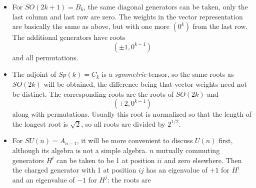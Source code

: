 \begin{itemize}
	The adjoint representation is an antisymmetric tensor, which is contained in the product of two vector representations. Weights are additive, so by adding any two different (due to antisymmetry) vector weights together, the root is obtained. This gives
	\begin{equation}
		(+1,+1,0^{k-2})\:,\quad (+1,-1,0^{k-2})\:,\quad (-1,-1,0^{k-2})\:, \label{11.4.16}
	\end{equation}
	and all their permutations. By adding any weight and its opposite weight together, we obtain $k$ zero roots, which are $H^{i}$.
	\begin{tcolorbox}[breakable]
		Examine the antisymmetric product $\lvert\lambda_{1}\rangle\wedge \lvert\lambda_{2}\rangle$ of 2 $2k$-vectors $\lvert \lambda_{1,2}\rangle$, and assume $\lvert\lambda_{1,2}\rangle$ only have eigenvalues $+1$ under $H^{1,2}$ respectively, then
		\begin{align*}
			&H^{1}\lvert \lambda_{1} \rangle \wedge \lvert \lambda_{2} \rangle = 1\\
			&H^{2} \lvert \lambda_{1} \rangle \wedge \lvert \lambda_{2} \rangle =1
		\end{align*}
		From this, (\ref{11.4.16}) is obtained
	\end{tcolorbox}
	In the spinor representation, weight $w^{i}$ is given by all $k$-vectors with all components being $\frac{1}{2}$, where $\mathbf{2^{k-1}}$ has an even number of $-\frac{1}{2}$, while $\mathbf{2^{k-1}}^{\prime}$ has an odd number.
	\item For $SO(2k+1)=B_{k}$, the same diagonal generators can be taken, only the last column and last row are zero. The weights in the vector representation are basically the same as above, but with one more $(0^{k})$ from the last row. The additional generators have roots
	\begin{equation}
		(\pm1,0^{k-1}) \label{11.4.17}
	\end{equation}
	and all permutations.
	\item The adjoint of $Sp(k)=C_{k}$ is a \emph{symmetric} tensor, so the same roots as $SO(2k)$ will be obtained, the difference being that vector weights need not be distinct. The corresponding roots are the roots of $SO(2k)$ and
	\begin{equation}
		(\pm2,0^{k-1}) \label{11.4.18}
	\end{equation}
	along with permutations. Usually this root is normalized so that the length of the longest root is $\sqrt{2}$, so all roots are divided by $2^{1/2}$.
	\item For $SU(n)=A_{n-1}$, it will be more convenient to discuss $U(n)$ first, although its algebra is not a simple algebra. $n$ mutually commuting generators $H^{i}$ can be taken to be 1 at position $ii$ and zero elsewhere. Then the charged generator with 1 at position $ij$ has an eigenvalue of $+1$ for $H^{i}$ and an eigenvalue of $-1$ for $H^{j}$: the roots are

\end{itemize}

